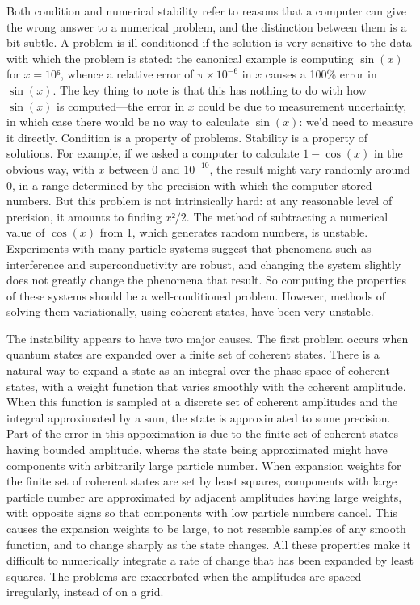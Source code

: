 Both condition and numerical stability refer to reasons that a computer can give the wrong answer to a numerical problem, and the distinction between them is a bit subtle.  A problem is ill-conditioned if the solution is very sensitive to the data with which the problem is stated: the canonical example is computing $\sin(x)$ for $x=10⁶$, whence a relative error of $π×10^{-6}$ in $x$ causes a 100\% error in $\sin(x)$.  The key thing to note is that this has nothing to do with how $\sin(x)$ is computed—the error in $x$ could be due to measurement uncertainty, in which case there would be no way to calculate $\sin(x)$: we'd need to measure it directly.  Condition is a property of problems.  Stability is a property of solutions.  For example, if we asked a computer to calculate $1-\cos(x)$ in the obvious way, with $x$ between 0 and $10^{-10}$, the result might vary randomly around 0, in a range determined by the precision with which the computer stored numbers.  But this problem is not intrinsically hard: at any reasonable level of precision, it amounts to finding $x²/2$.  The method of subtracting a numerical value of $\cos(x)$ from 1, which generates random numbers, is unstable.  Experiments with many-particle systems suggest that phenomena such as interference and superconductivity are robust, and changing the system slightly does not greatly change the phenomena that result. So computing the properties of these systems should be a well-conditioned problem.  However, methods of solving them variationally, using coherent states, have been very unstable.

The instability appears to have two major causes.  The first problem occurs when quantum states are expanded over a finite set of coherent states.  There is a natural way to expand a state as an integral over the phase space of coherent states, with a weight function that varies smoothly with the coherent amplitude.  When this function is sampled at a discrete set of coherent amplitudes and the integral approximated by a sum, the state is approximated to some precision.  Part of the error in this appoximation is due to the finite set of coherent states having bounded amplitude, wheras the state being approximated might have components with arbitrarily large particle number.  When expansion weights for the finite set of coherent states are set by least squares, components with large particle number are approximated by adjacent amplitudes having large weights, with opposite signs so that components with low particle numbers cancel.  This causes the expansion weights to be large, to not resemble samples of any smooth function, and to change sharply as the state changes.  All these properties make it difficult to numerically integrate a rate of change that has been expanded by least squares.  The problems are exacerbated when the amplitudes are spaced irregularly, instead of on a grid.

